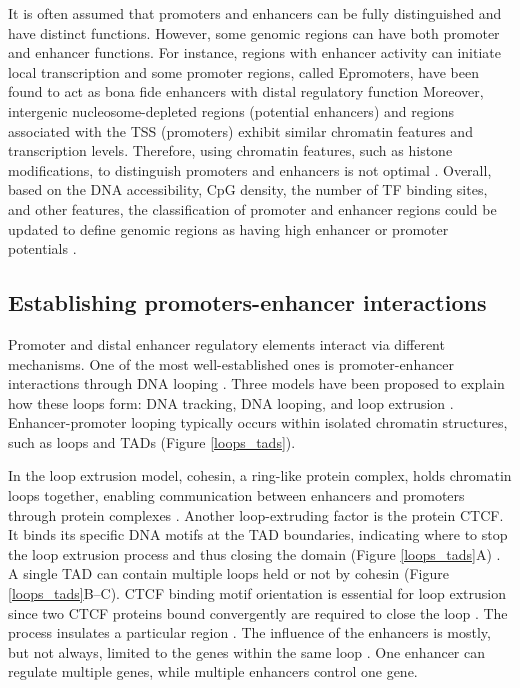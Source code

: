     It is often assumed that promoters and enhancers can be fully distinguished and have distinct functions. However, some genomic regions can have both promoter and enhancer functions. For instance, regions with enhancer activity can initiate local transcription \cite{andersson2020determinants} and some promoter regions, called Epromoters, have been found to act as bona fide enhancers with distal regulatory function \cite{medina2018widespread} Moreover, intergenic nucleosome-depleted regions (potential enhancers) and regions associated with the TSS (promoters) exhibit similar chromatin features and transcription levels. Therefore, using chromatin features, such as histone modifications, to distinguish promoters and enhancers is not optimal \cite{andersson2020determinants}. Overall, based on the DNA accessibility, CpG density, the number of TF binding sites, and other features, the classification of promoter and enhancer regions could be updated to define genomic regions as having high enhancer or promoter potentials \cite{andersson2020determinants}.

    \subsection{Establishing promoters-enhancer interactions}

    Promoter and distal enhancer regulatory elements interact via different mechanisms. One of the most well-established ones is promoter-enhancer interactions through DNA looping \cite{wurmser2022enhancer}. Three models have been proposed to explain how these loops form: DNA tracking, DNA looping, and loop extrusion \cite{monfils2021models}. Enhancer-promoter looping typically occurs within isolated chromatin structures, such as loops and \ac{TADs} ({Figure \ref{loops_tads}}).
    
    In the loop extrusion model, cohesin, a ring-like protein complex, holds chromatin loops together, enabling communication between enhancers and promoters through protein complexes \cite{smith2014enhancer,field2020evaluating,davidson2021genome}. Another loop-extruding factor is the protein \ac{CTCF}. It binds its specific DNA motifs at the TAD boundaries, indicating where to stop the loop extrusion process and thus closing the domain ({Figure \ref{loops_tads}}A) \cite{davidson2021genome}. A single TAD can contain multiple loops held or not by cohesin \cite{karpinska2023role,luppino2020cohesin,davidson2021genome} ({Figure \ref{loops_tads}}B--C). CTCF binding motif orientation is essential for loop extrusion since two CTCF proteins bound convergently are required to close the loop \cite{davidson2021genome}. The process insulates a particular region \cite{field2020evaluating}. The influence of the enhancers is mostly, but not always, limited to the genes within the same loop \cite{karpinska2023role,luppino2020cohesin,symmons2014functional}. One enhancer can regulate multiple genes, while multiple enhancers control one gene.

